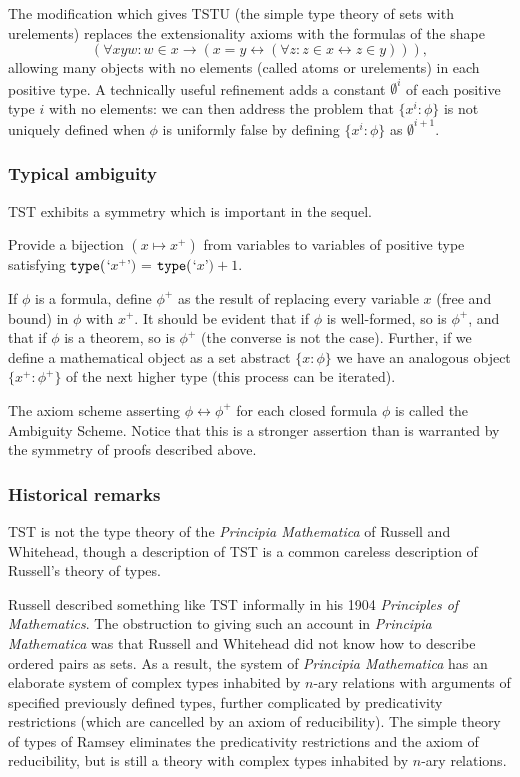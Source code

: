 \documentclass[12pt]{article}
\begin{document}
The modification which gives TSTU (the simple type theory of sets with urelements) replaces the extensionality axioms with the formulas of the shape $$(\forall xyw:w \in x \rightarrow (x=y \leftrightarrow (\forall z:z \in x \leftrightarrow z\in y))),$$  allowing many objects with no elements (called atoms or urelements)  in each positive type.  A technically useful refinement adds a constant $\emptyset^i$ of each positive type $i$ with no elements:  we can then address the problem that $\{x^i:\phi\}$ is not uniquely defined when $\phi$ is uniformly false by defining $\{x^i:\phi\}$ as $\emptyset^{i+1}$.

\subsubsection{Typical ambiguity}

TST exhibits a symmetry which is important in the sequel.

Provide a bijection $(x \mapsto x^+)$ from variables to variables of positive type satisfying   ${\tt type}($`$x^+$'$)$ = ${\tt type}($`$x$'$)+1$.

If $\phi$ is a formula, define $\phi^+$ as the result of replacing every variable $x$ (free and bound) in $\phi$ with $x^+$.  It should be evident that if $\phi$ is well-formed, so is $\phi^+$,
and that if $\phi$ is a theorem, so is $\phi^+$ (the converse is not the case).  Further, if we define a mathematical object as a set abstract $\{x:\phi\}$ we have an analogous
object $\{x^+:\phi^+\}$ of the next higher type (this process can be iterated).

The axiom scheme asserting $\phi \leftrightarrow \phi^+$ for each closed formula $\phi$ is called the Ambiguity Scheme.   Notice that this is a stronger assertion than is warranted by the symmetry of proofs described above.

\subsubsection{Historical remarks}

TST is not the type theory of the {\em Principia Mathematica\/} of Russell and Whitehead, though a description of TST is a common careless description of Russell's theory of types.

Russell described something like TST informally in his 1904 {\em Principles of Mathematics\/}.  The obstruction to giving such an account in {\em Principia Mathematica\/} was that
Russell and Whitehead did not know how to describe ordered pairs as sets.  As a result, the system of {\em Principia Mathematica\/} has an elaborate system of  complex
types inhabited by $n$-ary relations with arguments of specified previously defined types, further complicated by predicativity restrictions (which are cancelled by an axiom of reducibility).
The simple theory of types of Ramsey eliminates the predicativity restrictions and the axiom of reducibility, but is still a theory with complex types inhabited by $n$-ary relations.
\end{document}
